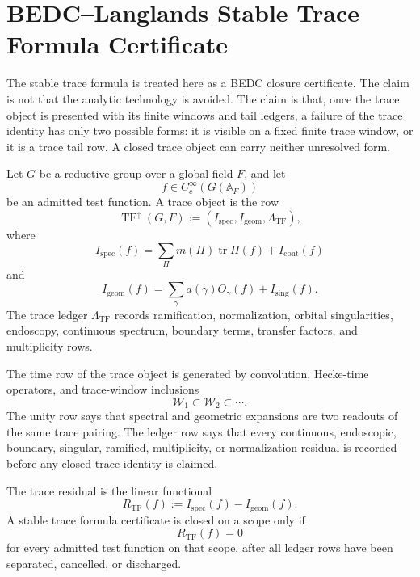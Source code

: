 \section{BEDC--Langlands Stable Trace Formula Certificate}
\label{sec:unified-reality-bedc-langlands-stable-trace-formula-cert}

The stable trace formula is treated here as a BEDC closure certificate.
The claim is not that the analytic technology is avoided. The claim is
that, once the trace object is presented with its finite windows and
tail ledgers, a failure of the trace identity has only two possible
forms: it is visible on a fixed finite trace window, or it is a trace
tail row. A closed trace object can carry neither unresolved form.

\begin{definition}
\label{def:unified-reality-trace-object}
Let $G$ be a reductive group over a global field $F$, and let
$$
f\in C_c^\infty(G(\mathbb A_F))
$$
be an admitted test function. A trace object is the row
$$
\operatorname{TF}^{\uparrow}(G,F)
:=
(I_{\mathrm{spec}},I_{\mathrm{geom}},\Lambda_{\mathrm{TF}}),
$$
where
$$
I_{\mathrm{spec}}(f)
=
\sum_{\Pi}m(\Pi)\operatorname{tr}\Pi(f)
+I_{\mathrm{cont}}(f)
$$
and
$$
I_{\mathrm{geom}}(f)
=
\sum_{\gamma}a(\gamma)O_\gamma(f)
+I_{\mathrm{sing}}(f).
$$
The trace ledger $\Lambda_{\mathrm{TF}}$ records ramification,
normalization, orbital singularities, endoscopy, continuous spectrum,
boundary terms, transfer factors, and multiplicity rows.
\end{definition}

\begin{definition}
\label{def:unified-reality-trace-three-properties-rows}
The time row of the trace object is generated by convolution,
Hecke-time operators, and trace-window inclusions
$$
\mathcal W_1\subset\mathcal W_2\subset\cdots.
$$
The unity row says that spectral and geometric expansions are two
readouts of the same trace pairing. The ledger row says that every
continuous, endoscopic, boundary, singular, ramified, multiplicity, or
normalization residual is recorded before any closed trace identity is
claimed.
\end{definition}

\begin{definition}
\label{def:unified-reality-trace-residual}
The trace residual is the linear functional
$$
R_{\mathrm{TF}}(f)
:=
I_{\mathrm{spec}}(f)-I_{\mathrm{geom}}(f).
$$
A stable trace formula certificate is closed on a scope only if
$$
R_{\mathrm{TF}}(f)=0
$$
for every admitted test function on that scope, after all ledger rows
have been separated, cancelled, or discharged.
\end{definition}

